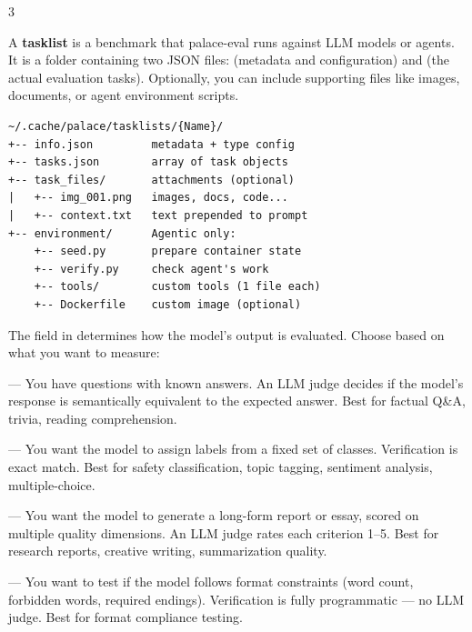 \documentclass[10pt,landscape]{article}
\begin{document}

\begin{multicols}{3}


A \textbf{tasklist} is a benchmark that palace-eval runs against LLM models or agents. It is a folder containing two JSON files:  (metadata and configuration) and  (the actual evaluation tasks). Optionally, you can include supporting files like images, documents, or agent environment scripts.

\begin{lstlisting}
~/.cache/palace/tasklists/{Name}/
+-- info.json         metadata + type config
+-- tasks.json        array of task objects
+-- task_files/       attachments (optional)
|   +-- img_001.png   images, docs, code...
|   +-- context.txt   text prepended to prompt
+-- environment/      Agentic only:
    +-- seed.py       prepare container state
    +-- verify.py     check agent's work
    +-- tools/        custom tools (1 file each)
    +-- Dockerfile    custom image (optional)
\end{lstlisting}


The  field in  determines how the model's output is evaluated. Choose based on what you want to measure:

 --- You have questions with known answers. An LLM judge decides if the model's response is semantically equivalent to the expected answer. Best for factual Q\&A, trivia, reading comprehension.

 --- You want the model to assign labels from a fixed set of classes. Verification is exact match. Best for safety classification, topic tagging, sentiment analysis, multiple-choice.

 --- You want the model to generate a long-form report or essay, scored on multiple quality dimensions. An LLM judge rates each criterion 1--5. Best for research reports, creative writing, summarization quality.

 --- You want to test if the model follows format constraints (word count, forbidden words, required endings). Verification is fully programmatic --- no LLM judge. Best for format compliance testing.


\end{multicols}
\end{document}
